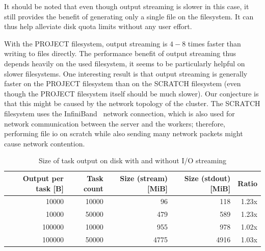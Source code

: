 It should be noted that even though output streaming is slower in this case, it still provides the
benefit of generating only a single file on the filesystem. It can thus help alleviate disk quota
limits without any user effort.

With the PROJECT filesystem, output streaming is $4-8$ times faster than writing
to files directly. The performance benefit of output streaming thus depends heavily on the used
filesystem, it seems to be particularly helpful on slower filesystems. One interesting result is
that output streaming is generally faster on the PROJECT filesystem than on the SCRATCH filesystem
(even though the PROJECT filesystem itself should be much slower). Our conjecture is that this
might be caused by the network topology of the cluster. The SCRATCH filesystem uses the
InfiniBand~\cite{infiniband} network connection, which is also used for network communication
between the server and the workers; therefore, performing file \gls{io} on scratch
while also sending many network packets might cause network contention.

\begin{table}[h]
	\centering
	\begin{tabular}{|r|r|r|r|r|}
		\hline
		Output per task [B] & Task count & Size (stream) [MiB] & Size (stdout) [MiB] & Ratio \\ \hline
		10000               & 10000      & 96                  & 118                 & 1.23x \\ \hline
		10000               & 50000      & 479                 & 589                 & 1.23x \\ \hline
		100000              & 10000      & 955                 & 978                 & 1.02x \\ \hline
		100000              & 50000      & 4775                & 4916                & 1.03x \\ \hline
	\end{tabular}
	\caption{Size of task output on disk with and without I/O streaming}
	\label{tab:hq-io-streaming-size}
\end{table}

